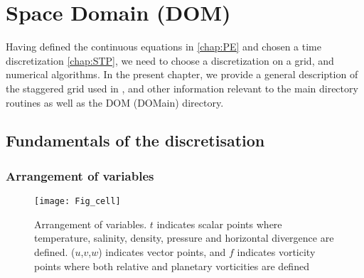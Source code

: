 \documentclass[../main/NEMO_manual]{subfiles}
\begin{document}
\chapter{Space Domain (DOM)}
\label{chap:DOM}

\minitoc


\newpage

Having defined the continuous equations in \autoref{chap:PE} and chosen a time discretization \autoref{chap:STP},
we need to choose a discretization on a grid, and numerical algorithms.
In the present chapter, we provide a general description of the staggered grid used in \NEMO,
and other information relevant to the main directory routines as well as the DOM (DOMain) directory.

\section{Fundamentals of the discretisation}
\label{sec:DOM_basics}

\subsection{Arrangement of variables}
\label{subsec:DOM_cell}

\begin{figure}[!tb]
  \begin{center}
    \texttt{[image: Fig\_cell]}
    \caption{
      \protect\label{fig:cell}
      Arrangement of variables.
      $t$ indicates scalar points where temperature, salinity, density, pressure and
      horizontal divergence are defined.
      ($u$,$v$,$w$) indicates vector points,
      and $f$ indicates vorticity points where both relative and planetary vorticities are defined
    }
  \end{center}
\end{figure}
\end{document}
